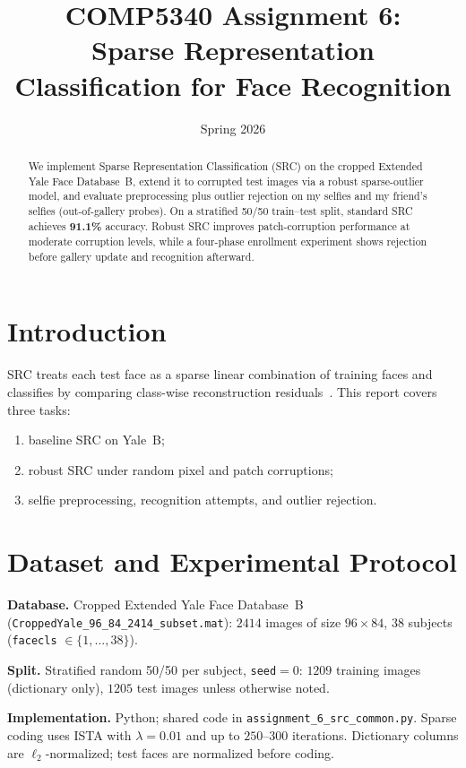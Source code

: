\documentclass[11pt,a4paper]{article}
\title{COMP5340 Assignment 6:\\Sparse Representation Classification for Face Recognition}
\author{}
\date{Spring 2026}
\begin{document}
\maketitle

\begin{abstract}
We implement Sparse Representation Classification (SRC) on the cropped Extended Yale Face Database~B,
extend it to corrupted test images via a robust sparse-outlier model, and evaluate preprocessing plus
outlier rejection on my selfies and my friend's selfies (out-of-gallery probes). On a stratified 50/50 train--test split, standard SRC achieves
\textbf{91.1\%} accuracy. Robust SRC improves patch-corruption performance at moderate corruption levels,
while a four-phase enrollment experiment shows rejection before gallery update and recognition afterward.
\end{abstract}

\section{Introduction}

SRC treats each test face as a sparse linear combination of training faces and classifies by comparing
class-wise reconstruction residuals~\cite{wright2009}. This report covers three tasks:
\begin{enumerate}[label=\textbf{Issue \arabic*:}, leftmargin=*]
  \item baseline SRC on Yale~B;
  \item robust SRC under random pixel and patch corruptions;
  \item selfie preprocessing, recognition attempts, and outlier rejection.
\end{enumerate}

\section{Dataset and Experimental Protocol}

\textbf{Database.} Cropped Extended Yale Face Database~B (\texttt{CroppedYale\_96\_84\_2414\_subset.mat}):
$2414$ images of size $96\times 84$, $38$ subjects (\texttt{facecls} $\in \{1,\ldots,38\}$).

\textbf{Split.} Stratified random 50/50 per subject, \texttt{seed}$=0$: $1209$ training images (dictionary only),
$1205$ test images unless otherwise noted.

\textbf{Implementation.} Python; shared code in \texttt{assignment\_6\_src\_common.py}. Sparse coding uses ISTA
with $\lambda=0.01$ and up to $250$--$300$ iterations. Dictionary columns are $\ell_2$-normalized; test faces
are normalized before coding.
\end{document}
